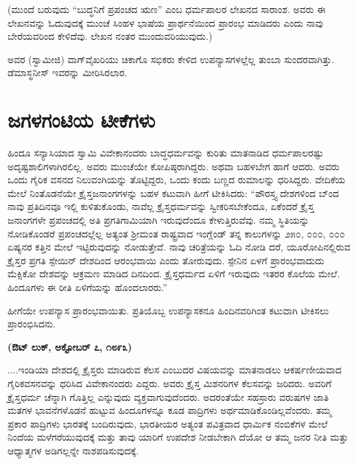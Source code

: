 (ಮುಂದೆ ಬರುವುದು “ಬುದ್ಧನಿಗೆ ಪ್ರಪಂಚದ ಋಣ” ಎಂಬ ಧರ್ಮಪಾಲರ ಲೇಖನದ ಸಾರಾಂಶ. ಅವರು ಈ ಲೇಖನವನ್ನು ಓದುವುದಕ್ಕೆ ಮುಂಚೆ ಸಿಂಹಳ ಭಾಷೆಯ ಪ್ರಾರ್ಥನೆಯಿಂದ ಪ್ರಾರಂಭ ಮಾಡಿದರು ಎಂದು ನಾವು ಬೇರೆಯವರಿಂದ ಕೇಳಿದೆವು. ಲೇಖನ ನಂತರ ಮುಂದುವರಿಯುವುದು.)

ಅವರ (ಸ್ವಾಮೀಜಿ) ವಾಗ್​ವೈಖರಿಯು ಚಿಕಾಗೊ ಸಭಿಕರು ಕೇಳಿದ ಉಪನ್ಯಾಸಗಳಲ್ಲೆಲ್ಲ ತುಂಬಾ ಸುಂದರವಾಗಿತ್ತು. ಡೆಮಾಸ್ಥನೀಸ್​ ಇವರನ್ನು ಮೀರಿಸಿರಲಾರ.


\section{ಜಗಳಗಂಟಿಯ ಟೀಕೆಗಳು}

ಹಿಂದೂ ಸನ್ಯಾಸಿಯಾದ ಸ್ವಾಮಿ ವಿವೇಕಾನಂದರು ಬಾದ್ಧಧರ್ಮವನ್ನು ಕುರಿತು ಮಾತನಾಡಿದ ಧರ್ಮಪಾಲರಷ್ಟು ಅದೃಷ್ಟಶಾಲಿಗಳಾಗಿರಲಿಲ್ಲ. ಅವರು ಮುಂಚೆಯೇ ಕೋಪಿಷ್ಠರಾಗಿದ್ದರು. ಅಥವಾ ಬಹಳಬೇಗ ಹಾಗೆ ಆದರು. ಅವರು ಒಂದು ಗೈರಿಕ ವಸನದ ನಿಲುವಂಗಿಯನ್ನು ತೊಟ್ಟಿದ್ದರು, ಒಂದು ಕಂದು ಬಣ್ಣದ ರುಮಾಲನ್ನು ಧರಿಸಿದ್ದರು. ವೇದಿಕೆಯ ಮೇಲೆ ನಿಂತೊಡನೆಯೇ ಕ್ರೈಸ್ತಜನಾಂಗಗಳನ್ನು ಬಹಳ ಕಟುವಾಗಿ ಹೀಗೆ ಟೀಕಿಸಿದರು: “ಪೌರಸ್ತ್ಯ ದೇಶಗಳಿಂದ ಬ್ಂದ ನಾವು ಪ್ರತಿದಿನವೂ ಇಲ್ಲಿ ಕುಳಿತುಕೊಂಡು, ನಾವೆಲ್ಲ ಕ್ರೈಸ್ತಧರ್ಮವನ್ನು ಸ್ವೀಕರಿಸಬೇಕೆಂದೂ, ಏಕೆಂದರೆ ಕ್ರೈಸ್ತ ಜನಾಂಗಗಳೇ ಪ್ರಪಂಚದಲ್ಲಿ ಅತಿ ಪ್ರಗತಿಗಾಮಿಯಾಗಿ ಇರುವುದೆಂದೂ ಕೇಳುತ್ತಿರುವೆವು. ನಮ್ಮ ಸ್ಥಿತಿಯನ್ನು ನೋಡಿಕೊಂಡರೆ ಪ್ರಪಂಚದಲ್ಲೆಲ್ಲ ಅತ್ಯಂತ ಶ‍್ರೀಮಂತ ರಾಷ್ಟ್ರವಾದ ಇಂಗ್ಲೆಂಡ್​ ತನ್ನ ಕಾಲುಗಳನ್ನು ೨೫೦, ೦೦೦, ೦೦೦ ಏಷ್ಯನರ ಕತ್ತಿನ ಮೇಲೆ ಇಟ್ಟಿರುವುದನ್ನು ನೋಡುತ್ತೇವೆ. ನಾವು ಚರಿತ್ರೆಯನ್ನು ಓದಿ ನೋಡಿ ದರೆ, ಯೂರೋಪಿನಲ್ಲಿರುವ ಕ್ರೈಸ್ತರ ಪ್ರಗತಿ ಸ್ಪೇಯಿನ್​ ದೇಶದಿಂದ ಆರಂಭವಾಯಿ ಎಂದು ತೋರುವುದು. ಸ್ಪೇನಿನ ಏಳಗೆ ಪ್ರಾರಂಭವಾದುದು ಮೆಕ್ಸಿಕೋ ದೇಶವನ್ನು ಆಕ್ರಮಣ ಮಾಡಿದ ದಿನದಿಂದ. ಕ್ರೈಸ್ತಧರ್ಮದ ಏಳಿಗೆ ಇರುವುದು ಇತರರ ಕೊಲೆಯ ಮೇಲೆ. ಹಿಂದೂಗಳು ಈ ರೀತಿ ಏಳಿಗೆಯನ್ನು ಹೊಂದಲಾರರು.”

ಹೀಗೆಯೇ ಉಪನ್ಯಾಸ ಪ್ರಾರಂಭವಾಯಿತು. ಪ್ರತಿಯೊಬ್ಬ ಉಪನ್ಯಾಸಕನೂ ಹಿಂದಿನವರಿಗಿಂತ ಕಟುವಾಗಿ ಟೀಕಿಸಲು ಪ್ರಾರಂಭಿಸಿದನು.

\delimiter

\begin{center}
\textbf{(ಔಟ್​ ಲುಕ್​, ಅಕ್ಟೋಬರ್​ ೭, ೧೮೯೩)}
\end{center}

....ಇಂಡಿಯಾ ದೇಶದಲ್ಲಿ ಕ್ರೈಸ್ತರು ಮಾಡಿರುವ ಕೆಲಸ ಎಂಬುದರ ವಿಷಯವನ್ನು ಮಾತನಾಡಲು ಆಕರ್ಷಣೀಯವಾದ ಗೈರಿಕವಸನವನ್ನು ಧರಿಸಿದ ವಿವೇಕಾನಂದರು ಎದ್ದರು. ಅವರು ಕ್ರೈಸ್ತ ಮಿಶನರಿಗಳ ಕೆಲಸವನ್ನು ಜರಿದರು. ಅವರಿಗೆ ಕ್ರೈಸ್ತಧರ್ಮ ಚೆನ್ನಾಗಿ ಗೊತ್ತಿಲ್ಲ ಎನ್ನುವುದು ವ್ಯಕ್ತವಾಗುವುದೆಂದರು. ಅದರಂತೆಯೇ ಸಹಸ್ರಾರು ವರುಷಗಳ ಜಾತಿ ಮತಗಳ ಭಾವನೆಗಳೊಡನೆ ಹುಟ್ಟುವ ಹಿಂದೂಗಳನ್ನೂ ಕೂಡ ಪಾದ್ರಿಗಳು ಅರ್ಥಮಾಡಿಕೊಂಡಿಲ್ಲವೆಂದರು. ತಮ್ಮ ಪ್ರಕಾರ ಪಾದ್ರಿಗಳು ಭಾರತಕ್ಕೆ ಬಂದಿರುವುದು, ಭಾರತೀಯರ ಅತ್ಯಂತ ಪವಿತ್ರವಾದ ಧಾರ್ಮಿಕ ನಂಬಿಕೆಗಳ ಮೇಲೆ ನಿಂದೆಯ ಮಳೆಗರೆಯುವುದಕ್ಕೆ ಮತ್ತು ತಾವು ಯಾರಿಗೆ ಉಪದೇಶ ನೀಡಬೇಕಾಗಿ ದೆಯೋ ಆ ತಮ್ಮ ಜನರ ನೀತಿ ಮತ್ತು ಆಧ್ಯಾತ್ಮಗಳ ಅಡಿಗಲ್ಲನ್ನೇ ನಾಶಪಡಿಸುವುದಕ್ಕೆ.

\delimiter

